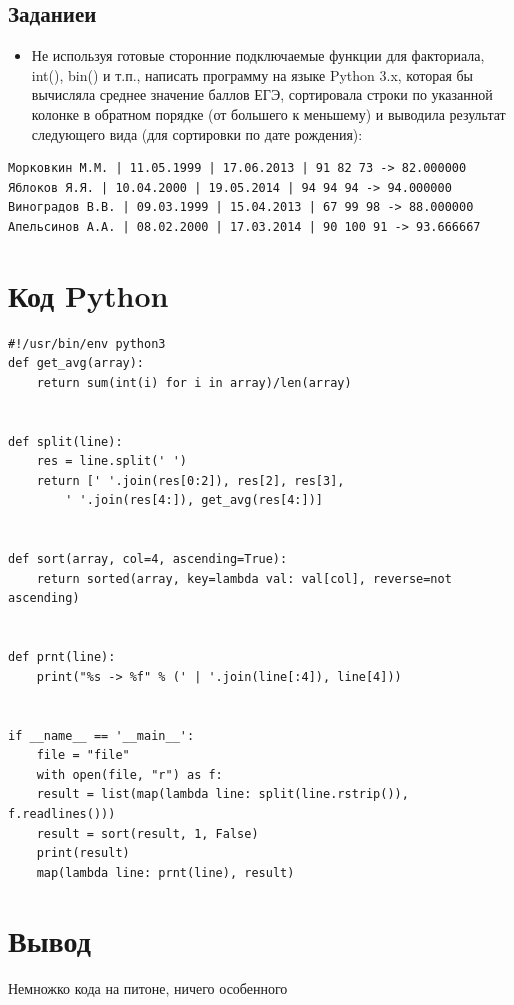 \documentclass[11pt]{article}
\begin{document}
\subsection{Заданиеи}
\label{sec:org1912528}
\normalsize
\begin{itemize}
\item Не используя готовые сторонние подключаемые функции для факториала, int(), bin() и т.п., написать программу на языке Python 3.x, которая бы вычисляла среднее значение баллов ЕГЭ, сортировала строки по указанной колонке в обратном порядке (от большего к меньшему) и выводила результат следующего вида (для сортировки по дате рождения):
\end{itemize}
\scriptsize
\begin{verbatim}
Морковкин М.М. | 11.05.1999 | 17.06.2013 | 91 82 73 -> 82.000000
Яблоков Я.Я. | 10.04.2000 | 19.05.2014 | 94 94 94 -> 94.000000
Виноградов В.В. | 09.03.1999 | 15.04.2013 | 67 99 98 -> 88.000000
Апельсинов А.А. | 08.02.2000 | 17.03.2014 | 90 100 91 -> 93.666667
\end{verbatim}

\section{Код Python}
\label{sec:org391e77a}
\scriptsize
\lstset{language=Python,label= ,caption= ,captionpos=b,numbers=none}
\begin{lstlisting}
#!/usr/bin/env python3
def get_avg(array):
    return sum(int(i) for i in array)/len(array)


def split(line):
    res = line.split(' ')
    return [' '.join(res[0:2]), res[2], res[3],
	    ' '.join(res[4:]), get_avg(res[4:])]


def sort(array, col=4, ascending=True):
    return sorted(array, key=lambda val: val[col], reverse=not ascending)


def prnt(line):
    print("%s -> %f" % (' | '.join(line[:4]), line[4]))


if __name__ == '__main__':
    file = "file"
    with open(file, "r") as f:
	result = list(map(lambda line: split(line.rstrip()), f.readlines()))
    result = sort(result, 1, False)
    print(result)
    map(lambda line: prnt(line), result)
\end{lstlisting}

\section{Вывод}
\label{sec:org0d257e0}
\normalsize
Немножко кода на питоне, ничего особенного
\end{document}
